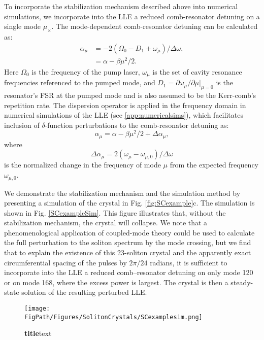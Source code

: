 To incorporate the stabilization mechanism described above into numerical simulations, we incorporate into the LLE a reduced comb-resonator detuning on a single mode $\mu_\times$. The mode-dependent comb-resonator detuning can be calculated as:
\begin{align}
\alpha_\mu&=-2(\Omega_0-D_1+\omega_\mu)/\Delta\omega,\\
&=\alpha-\beta\mu^2/2.
\end{align}
Here $\Omega_0$ is the frequency of the pump laser, $\omega_\mu$ is the set of cavity resonance frequencies referenced to the pumped mode, and $D_1=\partial\omega_\mu/\partial\mu|_{\mu=0}$ is the resonator's FSR at the pumped mode and is also assumed to be the Kerr-comb's repetition rate. The dispersion operator is applied in the frequency domain in numerical simulations of the LLE (see \ref{app:numericalsims}), which facilitates inclusion of $\delta$-function perturbations to the comb-resonator detuning as:
\begin{equation}
\alpha_\mu=\alpha-\beta\mu^2/2+\Delta\alpha_\mu,
\end{equation}
where
\begin{equation}
\Delta\alpha_\mu=2(\omega_\mu-\omega_{\mu,0})/\Delta\omega
\end{equation}
is the normalized change in the frequency of mode $\mu$ from the expected frequency $\omega_{\mu,0}$. 

We demonstrate the stabilization mechanism and the simulation method by presenting a simulation of the crystal in Fig. \ref{fig:SCexample}c. The simulation is shown in Fig. \ref{SCexampleSim}. This figure illustrates that, without the stabilization mechanism, the crystal will collapse. We note that a phenomenological application of coupled-mode theory\cite{Haus1991} could be used to calculate the full perturbation to the soliton spectrum by the mode crossing, but we find that to explain the existence of this 23-soliton crystal and the apparently exact circumferential spacing of the pulses by $2\pi/24$ radians, it is sufficient to incorporate into the LLE a reduced comb–resonator detuning on only mode 120 or on mode 168, where the excess power is largest. The crystal is then a steady-state solution of the resulting perturbed LLE.

\begin{figure}[htpb]
	\begin{center}
		\texttt{[image: \\FigPath/Figures/SolitonCrystals/SCexamplesim.png]}
	\end{center}
	\caption[Figure Title]{\textbf{title}text}
	\label{fig:SCexamplesim}
\end{figure} 


